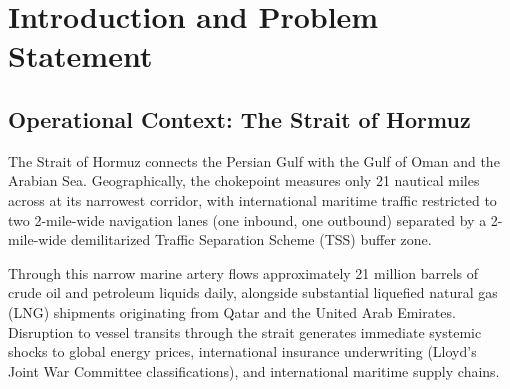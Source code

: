 \section{Introduction and Problem Statement}
\label{sec:introduction}

\subsection{Operational Context: The Strait of Hormuz}
The Strait of Hormuz connects the Persian Gulf with the Gulf of Oman and the Arabian Sea. Geographically, the chokepoint measures only 21 nautical miles across at its narrowest corridor, with international maritime traffic restricted to two 2-mile-wide navigation lanes (one inbound, one outbound) separated by a 2-mile-wide demilitarized Traffic Separation Scheme (TSS) buffer zone. 

Through this narrow marine artery flows approximately 21 million barrels of crude oil and petroleum liquids daily, alongside substantial liquefied natural gas (LNG) shipments originating from Qatar and the United Arab Emirates. Disruption to vessel transits through the strait generates immediate systemic shocks to global energy prices, international insurance underwriting (Lloyd's Joint War Committee classifications), and international maritime supply chains.


